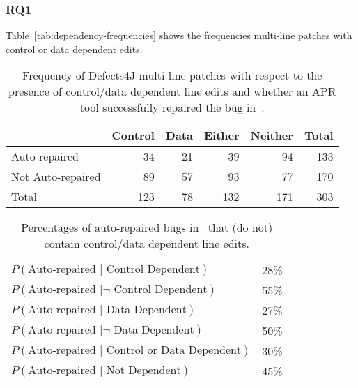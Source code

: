 \documentclass[sigconf, timestamp-false, anonymous=true]{acmart}
\begin{document}
\subsubsection{RQ1} Table~\ref{tab:dependency-frequencies} shows the 
frequencies multi-line patches with control or data dependent edits.

\begin{table}
{\begin{center}
	\begin{tabular}{l | rrrr | r}
            	\toprule
            	& Control & Data & Either & Neither & Total \\
            	\midrule
            	Auto-repaired & 34 & 21 & 39 & 94 & 133 \\
            	Not Auto-repaired & 89 & 57 & 93 & 77 & 170 \\
            	\midrule
            	Total & 123 & 78 & 132 & 171 & 303 \\
            	\bottomrule
	\end{tabular}
 \end{center}
}
	\caption{Frequency of Defects4J multi-line patches with respect to the presence of 
	control/data dependent line edits and whether an APR tool successfully 
	repaired the bug in~\cite{durieux-repair-them-all}.}
	\label{tab:dependency-repair-contingency-table}
\end{table}

\begin{table}
{\begin{center}
	\begin{tabular}{l | r}
            	\toprule
		$P(\mbox{Auto-repaired } | \mbox{ Control Dependent})$ & 28\% \\
		$P(\mbox{Auto-repaired } | \neg \mbox{ Control Dependent})$ & 55\% \\
		$P(\mbox{Auto-repaired } | \mbox{ Data Dependent})$ & 27\% \\
		$P(\mbox{Auto-repaired } | \neg \mbox{ Data Dependent})$ & 50\% \\
		$P(\mbox{Auto-repaired } | \mbox{ Control or Data Dependent})$ & 30\% \\
		$P(\mbox{Auto-repaired } | \mbox{ Not Dependent})$ & 45\% \\
		\bottomrule
	\end{tabular}
 \end{center}
}
	\caption{Percentages of auto-repaired bugs in~\cite{durieux-repair-them-all} 
	that (do not) contain control/data dependent line edits.}
	\label{tab:dependency-repair-percents}
\end{table}
\end{document}
